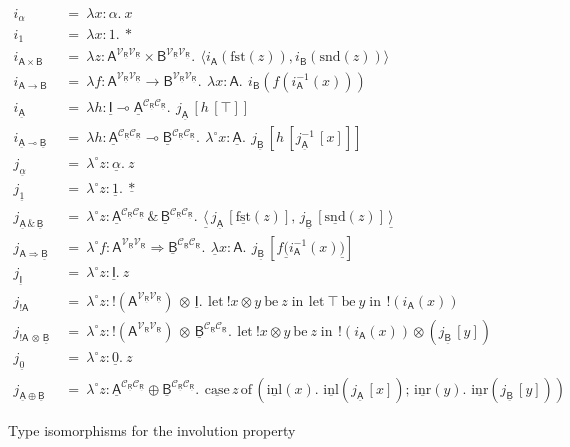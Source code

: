 \documentclass{LMCS}
\newcommand{\comptype}[1]{\underline{#1}}
\newcommand{\CconstA}{\comptype{\alpha}}
\newcommand{\VA}{\mathsf{A}}
\newcommand{\VB}{\mathsf{B}}
\newcommand{\CA}{\comptype{\mathsf{A}}}
\newcommand{\CB}{\comptype{\mathsf{B}}}
\newcommand{\CR}{\comptype{\mathsf{R}}}
\newcommand{\CI}{\comptype{\mathsf{I}}}
\newcommand{\Vone}{1}
\newcommand{\Vprod}{\times}
\newcommand{\Vfun}{\to}
\newcommand{\lpop}{\multimap}
\newcommand{\Cone}{\comptype{1}}
\newcommand{\Cprod}{\,\&\,}
\newcommand{\Cfun}{\Rightarrow}
\newcommand{\Cbang}[1]{{! #1}}
\newcommand{\Ccopower}[2]{! #1 \, {\otimes} \, #2}
\newcommand{\Czero}{\comptype{0}}
\newcommand{\Cplus}{\oplus}
\newcommand{\In}[2]{#1 \colon  \! #2}
\newcommand{\Vstar}{{*}}
\newcommand{\Vpair}[2]{\langle #1 , #2 \rangle}
\newcommand{\Vfst}[1]{\mathrm{fst}(#1)}
\newcommand{\Vsnd}[1]{\mathrm{snd}(#1)}
\newcommand{\Vlam}[3]{\lambda \In{#1}{#2}.\: #3}
\newcommand{\Vappl}[2]{#1(#2)}
\newcommand{\compop}[1]{\underline{#1}}
\newcommand{\Cstar}{\compop{*}}
\newcommand{\Cpair}[2]{\compop{\langle} #1 , #2 \compop{\rangle}}
\newcommand{\Cfst}[1]{\compop{\mathrm{fst}}(#1)}
\newcommand{\Csnd}[1]{\compop{\mathrm{snd}}(#1)}
\newcommand{\Clam}[3]{\compop{\lambda} \In{#1}{#2}.\: #3}
\newcommand{\Cappl}[2]{#1\compop{(}#2\compop{)}}
\newcommand{\bang}[1]{{! #1}}
\newcommand{\Itop}{\top}
\newcommand{\Ilet}[2]{\mathrm{let}\: {\Itop}\:\mathrm{be}\:{#1} \;\mathrm{in}\: #2}
\newcommand{\llambda}{\lambda^{\!\circ\!}}
\newcommand{\llam}[3]{\llambda \In{#1}{#2}.\: #3}
\newcommand{\lappl}[2]{#1[#2]}
\newcommand{\copowerterm}[2]{{\bang{#1}}\! \otimes \! #2}
\newcommand{\copowerlet}[4]{\mathrm{let}\: {\copowerterm{#1}{#2}}\:\mathrm{be}\:{#3} \;\mathrm{in}\: #4}
\newcommand{\Cinl}[1]{\compop{\mathrm{inl}}(#1)}
\newcommand{\Cinr}[1]{\compop{\mathrm{inr}}(#1)}
\newcommand{\Ccase}[5]{\compop{\mathrm{case}} \, #1 \,\mathrm{of}\,( \Cinl{#2}. \, #3 ; \, \Cinr{#4}. \, #5)}
\newcommand{\CpsVVT}[1]{#1^{\mathcal{V}_{\CR}\mathcal{V}_{\CR}}}
\newcommand{\CpsCCT}[1]{#1^{\mathcal{C}_{\CR}\mathcal{C}_{\CR}}}
\newcommand{\Viso}[1]{i_{#1}}
\newcommand{\Ciso}[1]{j_{#1}}
\begin{document}
\begin{figure}
\begin{align*}
\Viso{\alpha} \: & = \: \Vlam{x}{\alpha}{x} 
\\
\Viso{\Vone} \: & =  \: \Vlam{x}{\Vone}{\Vstar} 
\\
\Viso{\VA \Vprod \VB} \: & = \: \Vlam{z}{\CpsVVT{\VA} \Vprod \CpsVVT{\VB}}
      {\, \Vpair{\Vappl{\Viso{\VA}}{\Vfst{z}}}{\Vappl{\Viso{\VB}}{\Vsnd{z}}}}
\\
\Viso{\VA \Vfun \VB} \: & = \: \Vlam{f}{\CpsVVT{\VA} \Vfun \CpsVVT{\VB}}
      {\, \Vlam{x}{\VA}{\, \Vappl{\Viso{\VB}}{\Vappl{f}{\Vappl{\Viso{\VA}^{-1}}{x}}}}}
\\
\Viso{\CA} \: & = \: \Vlam{h}{\CI \lpop \CpsCCT{\CA}}
      {\, \lappl{\Ciso{\CA}\,}{\lappl{h\,}{\Itop}}}
\\
\Viso{\CA \lpop \CB} \: & = \: \Vlam{h}{\CpsCCT{\CA} \lpop \CpsCCT{\CB}}
      {\, \llam{x}{\CA}{\,\lappl{\Ciso{\CB}\,}{\lappl{h\,}{\lappl{\Ciso{\CA}^{-1}\,}{x}}}}}
\\[5pt]
\Ciso{\CconstA} \: & = \: \llam{z}{\CconstA}{z} 
\\
\Ciso{\Cone} \: & = \: \llam{z}{\Cone}{\Cstar} 
\\
\Ciso{\CA \Cprod \CB} \: & = \: \llam{z}{\CpsCCT{\CA} \Cprod \CpsCCT{\CB}}
      {\, \Cpair{\lappl{\,\Ciso{\CA}\,}{\Cfst{z}}}{\lappl{\,\Ciso{\CB}\,}{\Csnd{z}}\,}}
\\
\Ciso{\VA \Cfun \CB} \: & = \: \llam{f}{\CpsVVT{\VA} \Cfun \CpsCCT{\CB}}
      {\, \Clam{x}{\VA}{\, \lappl{\Ciso{\CB}\,}{\Cappl{f}{\Vappl{\Viso{\VA}^{-1}}{x}}}}}
\\
\Ciso{\CI} \: & = \: \llam{z}{\CI}{z} 
\\
\Ciso{\Cbang{\VA}} \: & = \: \llam{z}{\Ccopower{(\CpsVVT{\VA})}{\CI}}
      {\, \copowerlet{x}{y}{z}{\, \Ilet{y}{\, \bang{(\Vappl{\Viso{\VA}}{x})}}}}
\\
\Ciso{\Ccopower{\VA}{\CB}} \: & = \: \llam{z}{\Ccopower{(\CpsVVT{\VA})}{\CpsCCT{\CB}}}
      {\, \copowerlet{x}{y}{z}{\, \copowerterm{(\Vappl{\Viso{\VA}}{x})}{(\lappl{\Ciso{\CB}\,}{y})}}}
\\
\Ciso{\Czero} \: & = \: \llam{z}{\Czero}{z} 
\\
\Ciso{\CA \Cplus \CB} \: & = \: \llam{z}{\CpsCCT{\CA} \Cplus \CpsCCT{\CB}}
      {\, \Ccase{z}{x}{\,\Cinl{\lappl{\Ciso{\CA}\,}{x}}}{y}{\,\Cinr{\lappl{\Ciso{\CB}\,}{y}}}}
\end{align*}
\caption{Type isomorphisms for the involution property}
\label{fig:tiip}
\end{figure}
\end{document}
